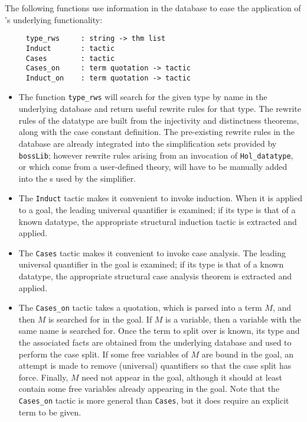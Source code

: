 The following functions use information in the database to ease the
application of \HOL's underlying functionality:

\begin{verbatim}
     type_rws     : string -> thm list
     Induct       : tactic
     Cases        : tactic
     Cases_on     : term quotation -> tactic
     Induct_on    : term quotation -> tactic
\end{verbatim}

\begin{itemize}

\item
The function \texttt{type\_rws} will search for the given type
by name in the underlying database and return useful
rewrite rules for that type. The rewrite rules of the
datatype are built from the injectivity and distinctness theorems, along
with the case constant definition. The pre-existing rewrite rules in the
database are already integrated into the simplification sets provided
by \verb+bossLib+; however rewrite rules arising from an invocation of
\verb+Hol_datatype+, or which come from a user-defined theory, will have
to be manually added into the \simpset{}s used by the simplifier.

\item
The \texttt{Induct} tactic makes it convenient to invoke
induction. When it is applied to a goal, the leading universal
quantifier is examined; if its type is that of a known datatype, the
appropriate structural induction tactic is extracted and applied.

\item
The \texttt{Cases} tactic makes it convenient to invoke case
analysis. The leading universal quantifier in the goal is examined; if
its type is that of a known datatype, the appropriate structural
case analysis theorem is extracted and applied.

\item The \texttt{Cases\_on} tactic takes a quotation, which is
parsed into a term $M$, and then $M$ is searched for in the goal. If $M$
is a variable, then a variable with the same name is searched for. Once
the term to split over is known, its type and the associated facts are
obtained from the underlying database and used to perform the case
split. If some free variables of $M$ are bound in the goal, an attempt
is made to remove (universal) quantifiers so that the case split has
force. Finally, $M$ need not appear in the goal, although it should at
least contain some free variables already appearing in the goal. Note
that the \verb+Cases_on+ tactic is more general than \verb+Cases+, but
it does require an explicit term to be given.


\end{itemize}
